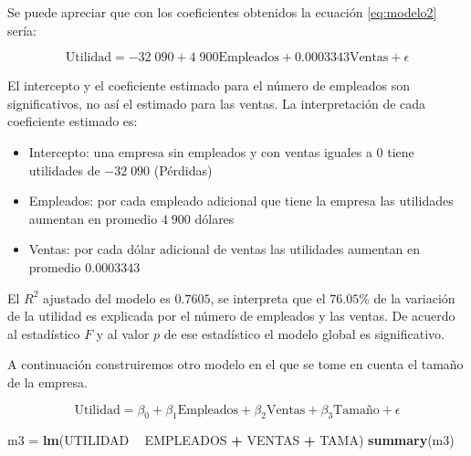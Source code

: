 \documentclass[
]{krantz}
\makeatletter
\newenvironment{Shaded}{\begin{snugshade}}{\end{snugshade}}
\newcommand{\KeywordTok}[1]{\textcolor[rgb]{0.27,0.27,0.27}{\textbf{#1}}}
\newcommand{\NormalTok}[1]{#1}
\newcommand{\OperatorTok}[1]{\textcolor[rgb]{0.43,0.43,0.43}{\textbf{#1}}}
\newcommand{\StringTok}[1]{\textcolor[rgb]{0.5,0.5,0.5}{#1}}
\providecommand{\tightlist}{%
  \setlength{\itemsep}{0pt}\setlength{\parskip}{0pt}}
\newenvironment{kframe}{%
\medskip{}
\setlength{\fboxsep}{.8em}
 \def\at@end@of@kframe{}%
 \ifinner\ifhmode%
  \def\at@end@of@kframe{\end{minipage}}%
  \begin{minipage}{\columnwidth}%
 \fi\fi%
 \def\FrameCommand##1{\hskip\@totalleftmargin \hskip-\fboxsep
 \colorbox{shadecolor}{##1}\hskip-\fboxsep
     \hskip-\linewidth \hskip-\@totalleftmargin \hskip\columnwidth}%
 \MakeFramed {\advance\hsize-\width
   \@totalleftmargin\z@ \linewidth\hsize
   \@setminipage}}%
 {\par\unskip\endMakeFramed%
 \at@end@of@kframe}
\renewenvironment{Shaded}{\begin{kframe}}{\end{kframe}}
\makeatother
\begin{document}
Se puede apreciar que con los coeficientes obtenidos la ecuación \eqref{eq:modelo2} sería:

\begin{equation}
  \text{Utilidad} = -32\;090 + 4\;900 \text{Empleados} + 0.0003343 \text{Ventas} + \epsilon
    \label{eq:modelo3}
\end{equation}

El intercepto y el coeficiente estimado para el número de empleados son significativos, no así el estimado para las ventas. La interpretación de cada coeficiente estimado es:

\begin{itemize}
\tightlist
\item
  Intercepto: una empresa sin empleados y con ventas iguales a 0 tiene utilidades de \(-32\;090\) (Pérdidas)
\item
  Empleados: por cada empleado adicional que tiene la empresa las utilidades aumentan en promedio \(4\;900\) dólares
\item
  Ventas: por cada dólar adicional de ventas las utilidades aumentan en promedio \(0.0003343\)
\end{itemize}

El \(R^2\) ajustado del modelo es \(0.7605\), se interpreta que el \(76.05\)\% de la variación de la utilidad es explicada por el número de empleados y las ventas. De acuerdo al estadístico \(F\) y al valor \(p\) de ese estadístico el modelo global es significativo.

A continuación construiremos otro modelo en el que se tome en cuenta el tamaño de la empresa.

\begin{equation}
  \text{Utilidad} = \beta_0 + \beta_1 \text{Empleados} + \beta_2 \text{Ventas} + \beta_3 \text{Tamaño} + \epsilon
    \label{eq:modelo4}
\end{equation}

\begin{Shaded}
\begin{Highlighting}[]
\NormalTok{m3 =}\StringTok{ }\KeywordTok{lm}\NormalTok{(UTILIDAD }\OperatorTok{~}\StringTok{ }\NormalTok{EMPLEADOS }\OperatorTok{+}\StringTok{ }\NormalTok{VENTAS }\OperatorTok{+}\StringTok{ }\NormalTok{TAMA)}
\KeywordTok{summary}\NormalTok{(m3)}
\end{Highlighting}
\end{Shaded}
\end{document}
